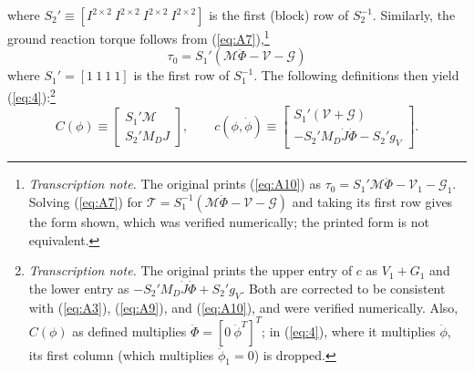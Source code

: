 \documentclass[11pt]{article}
\newcommand{\tnote}[1]{\footnote{\textit{Transcription note.} #1}}
\begin{document}
where $S_2'\equiv[I^{2\times2}\ I^{2\times2}\ I^{2\times2}\ I^{2\times2}]$ is
the first (block) row of $S_2^{-1}$. Similarly, the ground reaction torque
follows from (\ref{eq:A7}),\tnote{The original prints (\ref{eq:A10}) as
$\tau_0=S_1'\mathcal{M}\ddot{\Phi}-\mathcal{V}_1-\mathcal{G}_1$. Solving
(\ref{eq:A7}) for $\mathcal{T}=S_1^{-1}(\mathcal{M}\ddot{\Phi}-\mathcal{V}
-\mathcal{G})$ and taking its first row gives the form shown, which was
verified numerically; the printed form is not equivalent.}
\begin{equation}
\tau_0 = S_1'(\mathcal{M}\ddot{\Phi} - \mathcal{V} - \mathcal{G})
\label{eq:A10}
\end{equation}
where $S_1'=[1\ 1\ 1\ 1]$ is the first row of $S_1^{-1}$. The following
definitions then yield (\ref{eq:4}):\tnote{The original prints the upper
entry of $c$ as $V_1+G_1$ and the lower entry as
$-S_2'M_D\dot{J}\dot{\Phi}+S_2'g_V$. Both are corrected to be consistent with
(\ref{eq:A3}), (\ref{eq:A9}), and (\ref{eq:A10}), and were verified
numerically. Also, $C(\phi)$ as defined multiplies $\ddot{\Phi}=[0\
\ddot{\phi}^T]^T$; in (\ref{eq:4}), where it multiplies $\ddot{\phi}$, its
first column (which multiplies $\ddot{\phi}_1=0$) is dropped.}
\[
C(\phi) \equiv \begin{bmatrix}S_1'\mathcal{M}\\
S_2' M_D J\end{bmatrix},
\qquad
c(\phi,\dot{\phi}) \equiv \begin{bmatrix}
S_1'(\mathcal{V} + \mathcal{G})\\
-S_2'M_D\dot{J}\dot{\Phi} - S_2'g_V
\end{bmatrix}.
\]
\end{document}

